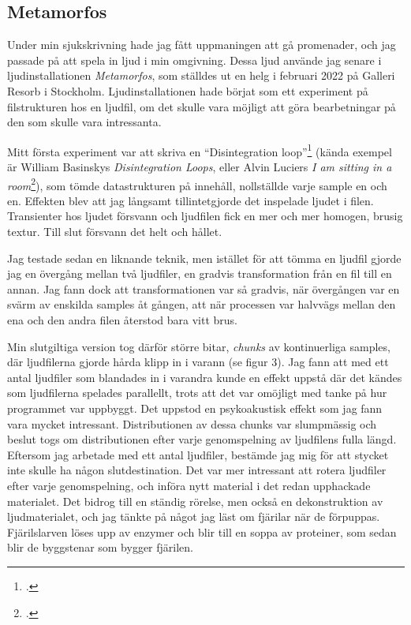 \documentclass{article}
\begin{document}
\subsection{Metamorfos}\nocite{META}
Under min sjukskrivning hade jag fått uppmaningen att gå promenader, och jag passade på att spela in ljud i
min omgivning. Dessa ljud använde jag senare i ljudinstallationen \emph{Metamorfos}, som ställdes ut en helg i
februari 2022 på Galleri Resorb i Stockholm. Ljudinstallationen hade börjat som ett experiment på
filstrukturen hos en ljudfil, om det skulle vara möjligt att göra bearbetningar på den som skulle vara
intressanta. 

Mitt första experiment var att skriva en ``Disintegration loop''\footcite{Basinski} (kända
exempel är William Basinskys \emph{Disintegration Loops}, eller Alvin Luciers \emph{I am sitting in a
room}\footcite{Lucier}), som tömde datastrukturen på innehåll, nollställde varje sample en och en. Effekten
blev att jag långsamt tillintetgjorde det inspelade ljudet i filen. Transienter hos ljudet försvann och
ljudfilen fick en mer och mer homogen, brusig textur. Till slut försvann det helt och hållet.

Jag testade sedan en liknande teknik, men istället för att tömma en ljudfil gjorde jag en övergång
mellan två ljudfiler, en gradvis transformation från en fil till en annan. Jag fann dock att
transformationen var så gradvis, när övergången var en svärm av enskilda samples åt gången, att när processen
var halvvägs mellan den ena och den andra filen återstod bara vitt brus.

Min slutgiltiga version tog därför större bitar, \emph{chunks} av kontinuerliga samples, där ljudfilerna gjorde
hårda klipp in i varann (se figur 3). Jag fann att med ett antal ljudfiler som blandades in i varandra kunde en effekt
uppstå där det kändes som ljudfilerna spelades parallellt, trots att det var omöjligt med tanke på hur
programmet var uppbyggt. Det uppstod en psykoakustisk effekt som jag fann vara mycket intressant.
Distributionen av dessa chunks var slumpmässig och beslut togs om distributionen efter varje genomspelning
av ljudfilens fulla längd. Eftersom jag arbetade med ett antal ljudfiler, bestämde jag mig för att stycket
inte skulle ha någon slutdestination. Det var mer intressant att rotera ljudfiler efter varje genomspelning,
och införa nytt material i det redan upphackade materialet. Det bidrog till en ständig rörelse, men också en
dekonstruktion av ljudmaterialet, och jag tänkte på något jag läst om fjärilar när de förpuppas. Fjärilslarven
löses upp av enzymer och blir till en soppa av proteiner, som sedan blir de byggstenar som bygger fjärilen.
\end{document}
